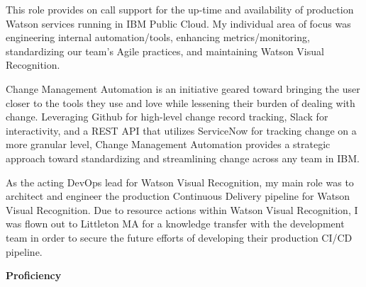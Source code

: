 \documentclass[10pt,a4paper,ragged2e,withhyper]{altacv}
\begin{document}
\begin{paracol}{2}
\divider

This role provides on call support for the up-time and availability of production Watson services running in IBM Public Cloud. My individual area of focus was engineering internal automation/tools, enhancing metrics/monitoring, standardizing our team's Agile practices, and maintaining Watson Visual Recognition.

\medskip


Change Management Automation is an initiative geared toward bringing the user closer to the tools they use and love while lessening their burden of dealing with change. Leveraging Github for high-level change record tracking, Slack for interactivity, and a REST API that utilizes ServiceNow for tracking change on a more granular level, Change Management Automation provides a strategic approach toward standardizing and streamlining change across any team in IBM.

\divider

As the acting DevOps lead for Watson Visual Recognition, my main role was to architect and engineer the production Continuous Delivery pipeline for Watson Visual Recognition. Due to resource actions within Watson Visual Recognition, I was flown out to Littleton MA for a knowledge transfer with the development team in order to secure the future efforts of developing their production CI/CD pipeline.

\switchcolumn
\smallskip
{}

\textcolor{accent}{\textbf{Proficiency}}\smallskip








\divider


\end{paracol}
\end{document}
